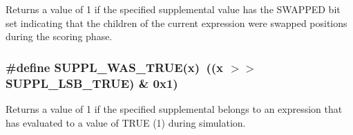 Returns a value of 1 if the specified supplemental value has the SWAPPED bit set indicating that the children of the current expression were swapped positions during the scoring phase. 
\subsubsection{\setlength{\rightskip}{0pt plus 5cm}\#define SUPPL\_\-WAS\_\-TRUE(x)\ ((x $>$$>$ SUPPL\_\-LSB\_\-TRUE) \& 0x1)}\label{group__expr__suppl_a28}


Returns a value of 1 if the specified supplemental belongs to an expression that has evaluated to a value of TRUE (1) during simulation. 